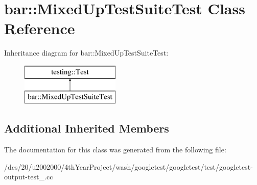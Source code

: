 \hypertarget{classbar_1_1MixedUpTestSuiteTest}{}\section{bar\+:\+:Mixed\+Up\+Test\+Suite\+Test Class Reference}
\label{classbar_1_1MixedUpTestSuiteTest}
Inheritance diagram for bar\+:\+:Mixed\+Up\+Test\+Suite\+Test\+:\begin{figure}[H]
\begin{center}
\leavevmode
\includegraphics[height=2.000000cm]{classbar_1_1MixedUpTestSuiteTest}
\end{center}
\end{figure}
\subsection*{Additional Inherited Members}


The documentation for this class was generated from the following file\+:\begin{DoxyCompactItemize}
\item 
/dcs/20/u2002000/4th\+Year\+Project/wash/googletest/googletest/test/googletest-\/output-\/test\+\_\+.\+cc\end{DoxyCompactItemize}
